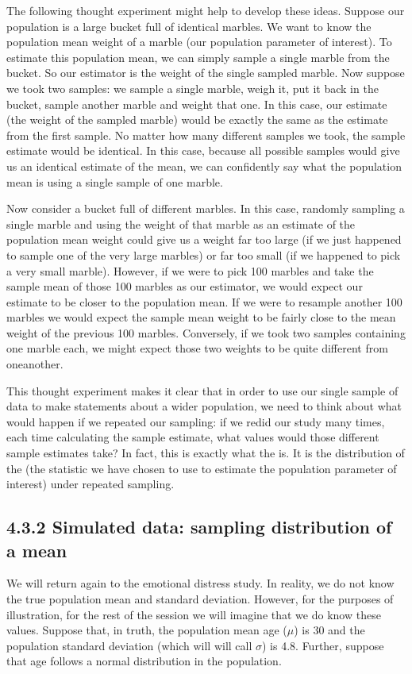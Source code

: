 \documentclass[letterpaper,10pt,english]{jupyterBook}
\begin{document}
\sphinxAtStartPar
The following thought experiment might help to develop these ideas. Suppose our population is a large bucket full of identical marbles. We want to know the population mean weight of a marble (our population parameter of interest). To estimate this population mean, we can simply sample a single marble from the bucket. So our estimator is the weight of the single sampled marble. Now suppose we took two samples: we sample a single marble, weigh it, put it back in the bucket, sample another marble and weight that one. In this case, our estimate (the weight of the sampled marble) would be exactly the same as the estimate from the first sample. No matter how many different samples we took, the sample estimate would be identical. In this case, because all possible samples would give us an identical estimate of the mean, we can confidently say what the population mean is using a single sample of one marble.

\sphinxAtStartPar
Now consider a bucket full of different marbles. In this case, randomly sampling a single marble and using the weight of that marble as an estimate of the population mean weight could give us a weight far too large (if we just happened to sample one of the very large marbles) or far too small (if we happened to pick a very small marble). However, if we were to pick 100 marbles and take the sample mean of those 100 marbles as our estimator, we would expect our estimate to be closer to the population mean. If we were to resample another 100 marbles we would expect the sample mean weight to be fairly close to the mean weight of the previous 100 marbles. Conversely, if we took two samples containing one marble each, we might expect those two weights to be quite different from one\sphinxhyphen{}another.

\sphinxAtStartPar
This thought experiment makes it clear that in order to use our single sample of data to make statements about a wider population, we need to think about what would happen if we repeated our sampling: if we re\sphinxhyphen{}did our study many times, each time calculating the sample estimate, what values would those different sample estimates take? In fact, this is exactly what the  is. It is the distribution of the  (the statistic we have chosen to use to estimate the population parameter of interest) under repeated sampling.


\subsection{4.3.2 Simulated data: sampling distribution of a mean}
\label{\detokenize{04.d. Population.and.samples:simulated-data-sampling-distribution-of-a-mean}}
\sphinxAtStartPar
We will return again to the emotional distress study. In reality, we do not know the true population mean and standard deviation. However, for the purposes of illustration, for the rest of the session we will imagine that we do know these values. Suppose that, in truth, the population mean age (\(\mu\)) is 30 and the population standard deviation (which will will call \(\sigma\)) is 4.8. Further, suppose that age follows a normal distribution in the population.
\end{document}
